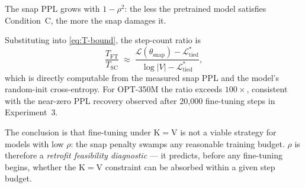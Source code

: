 \begin{remark}
\begin{itemize}
        The snap PPL grows with $1-\rho^2$: the less the pretrained
        model satisfies Condition~C, the more the snap damages it.
\end{itemize}

Substituting into \eqref{eq:T-bound}, the step-count ratio is
\begin{equation}
  \frac{T_{\mathrm{FT}}}{T_{\mathrm{SC}}}
  \;\approx\;
  \frac{\mathcal{L}(\theta_{\mathrm{snap}}) - \mathcal{L}^*_{\mathrm{tied}}}
       {\log|V| - \mathcal{L}^*_{\mathrm{tied}}},
  \label{eq:ratio}
\end{equation}
which is directly computable from the measured snap PPL and the
model's random-init cross-entropy.
For OPT-350M the ratio exceeds $100{\times}$, consistent with the
near-zero PPL recovery observed after 20{,}000 fine-tuning steps
in Experiment~3.

The conclusion is that fine-tuning under K$=$V is not a viable
strategy for models with low $\rho$: the snap penalty swamps any
reasonable training budget.
$\rho$ is therefore a \emph{retrofit feasibility diagnostic} ---
it predicts, before any fine-tuning begins, whether the
K$=$V constraint can be absorbed within a given step budget.
\end{remark}

